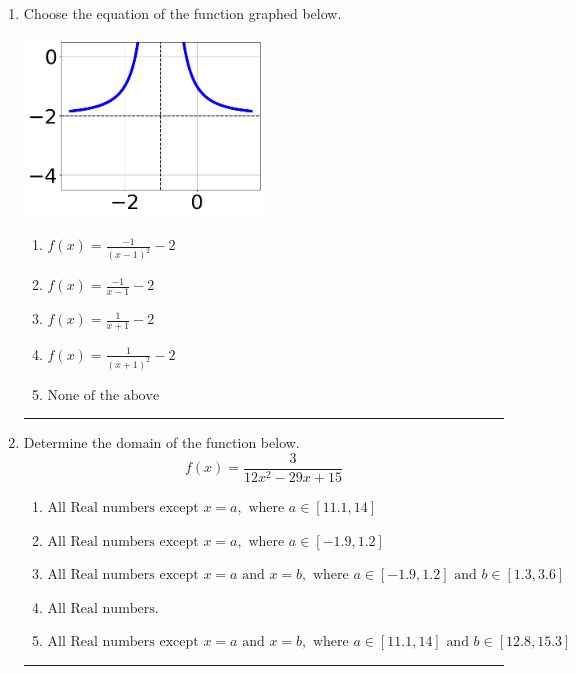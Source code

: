 \documentclass[14pt]{extbook}
\newcommand{\litem}[1]{\item#1\hspace*{-1cm}\rule{\textwidth}{0.4pt}}
\begin{document}
\begin{enumerate}
{\begin{enumerate}[label=\Alph*.]
\end{enumerate} }
\litem{
Choose the equation of the function graphed below.
\begin{center}
    \includegraphics[width=0.5\textwidth]{../Figures/rationalGraphToEquationC.png}
\end{center}
\begin{enumerate}[label=\Alph*.]
\item \( f(x) = \frac{-1}{(x - 1)^2} - 2 \)
\item \( f(x) = \frac{-1}{x - 1} - 2 \)
\item \( f(x) = \frac{1}{x + 1} - 2 \)
\item \( f(x) = \frac{1}{(x + 1)^2} - 2 \)
\item \( \text{None of the above} \)

\end{enumerate} }
\litem{
Determine the domain of the function below.\[ f(x) = \frac{3}{12x^{2} -29 x + 15} \]\begin{enumerate}[label=\Alph*.]
\item \( \text{All Real numbers except } x = a, \text{ where } a \in [11.1, 14] \)
\item \( \text{All Real numbers except } x = a, \text{ where } a \in [-1.9, 1.2] \)
\item \( \text{All Real numbers except } x = a \text{ and } x = b, \text{ where } a \in [-1.9, 1.2] \text{ and } b \in [1.3, 3.6] \)
\item \( \text{All Real numbers.} \)
\item \( \text{All Real numbers except } x = a \text{ and } x = b, \text{ where } a \in [11.1, 14] \text{ and } b \in [12.8, 15.3] \)


\end{enumerate}}
\end{enumerate}
\end{document}
